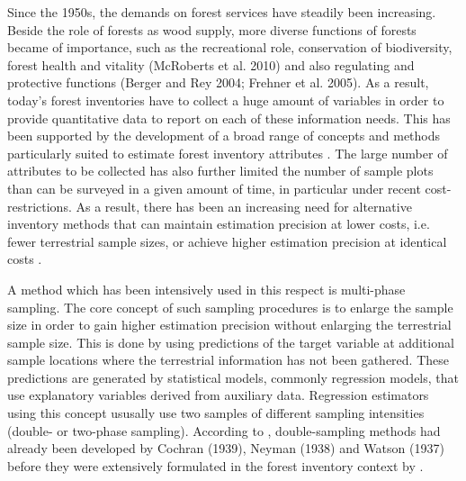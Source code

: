 Since the 1950s, the demands on forest services have steadily been increasing. Beside the role of forests as wood supply, more diverse functions of forests became of importance, such as the recreational role, conservation of biodiversity, forest health and vitality (McRoberts et al. 2010) and also regulating and protective functions (Berger and Rey 2004; Frehner et al. 2005). As a result, today's forest inventories have to collect a huge amount of variables in order to provide quantitative data to report on each of these information needs. This has been supported by the development of a broad range of concepts and methods particularly suited to estimate forest inventory attributes \citep{gregoire2007, kohl2006, mandallaz2008, schreuder1993}. The large number of attributes to be collected has also further limited the number of sample plots than can be surveyed in a given amount of time, in particular under recent cost-restrictions. As a result, there has been an increasing need for alternative inventory methods that can maintain estimation precision at lower costs, i.e. fewer terrestrial sample sizes, or achieve higher estimation precision at identical costs \citep{vonluepke2013}. 

A method which has been intensively used in this respect is multi-phase sampling. The core concept of such sampling procedures is to enlarge the sample size in order to gain higher estimation precision without enlarging the terrestrial sample size. This is done by using predictions of the target variable at additional sample locations where the terrestrial information has not been gathered. These predictions are generated by statistical models, commonly regression models, that use explanatory variables derived from auxiliary data. Regression estimators using this concept ususally use two samples of different sampling intensities (double- or two-phase sampling). According to \citet{schreuder1993}, double-sampling methods had already been developed by Cochran (1939), Neyman (1938) and Watson (1937) before they were extensively formulated in the forest inventory context by \citet{schreuder1993, kohl2006, gregoire2007, mandallaz2008}.

